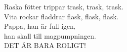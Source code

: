 
Raska fötter trippar trask, trask, trask. \\ Vita rockar fladdrar flask, flask, flask. \\ Pappa, han är full igen, \\ han skall till magpumpningen. \\ DET ÄR BARA ROLIGT!